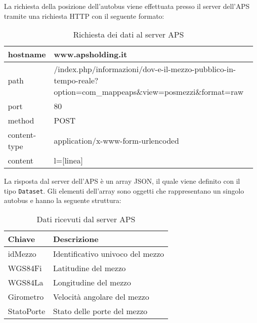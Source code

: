  \label{app:aps}

La richiesta della posizione dell'autobus viene effettuata presso il server dell'APS tramite una richiesta HTTP con il seguente formato:

\begin{table}[H]
	\centering
	\begin{tabu}{| X[0.4] | X |}
		\hline
		hostname & www.apsholding.it \\ \hline
		path & /index.php/informazioni/dov-e-il-mezzo-pubblico-in-tempo-reale?option=com\_mappeaps\&view=posmezzi\&format=raw  \\ \hline
		port & 80 \\ \hline		
		method & POST \\ \hline 
		content-type & application/x-www-form-urlencoded \\ \hline
		content & l=[linea] \\ \hline
	\end{tabu}
	\caption{Richiesta dei dati al server APS}
\end{table}

La risposta dal server dell'APS è un array JSON, il quale viene definito con il tipo \texttt{Dataset}. Gli elementi dell'array sono oggetti che rappresentano un singolo autobus e hanno la seguente struttura:

\begin{table}[H]
	\centering
	\begin{tabu}{| X[0.4] | X |}
		\hline
		\rowfont{\bfseries}
		Chiave & Descrizione \\ \hline
		idMezzo & Identificativo univoco del mezzo \\ \hline
		WGS84Fi & Latitudine del mezzo \\ \hline
		WGS84La & Longitudine del mezzo \\ \hline
		Girometro & Velocità angolare del mezzo \\ \hline
		StatoPorte & Stato delle porte del mezzo \\ \hline
	\end{tabu}
	\caption{Dati ricevuti dal server APS}
\end{table}